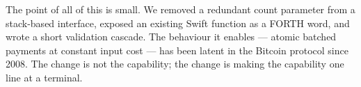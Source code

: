 \documentclass[a4paper, 11pt]{article}
\begin{document}
\begin{notebox}
The point of all of this is small. We removed a redundant count parameter from a stack-based interface, exposed an existing Swift function as a FORTH word, and wrote a short validation cascade. The behaviour it enables --- atomic batched payments at constant input cost --- has been latent in the Bitcoin protocol since 2008. The change is not the capability; the change is making the capability one line at a terminal.
\end{notebox}
\end{document}
